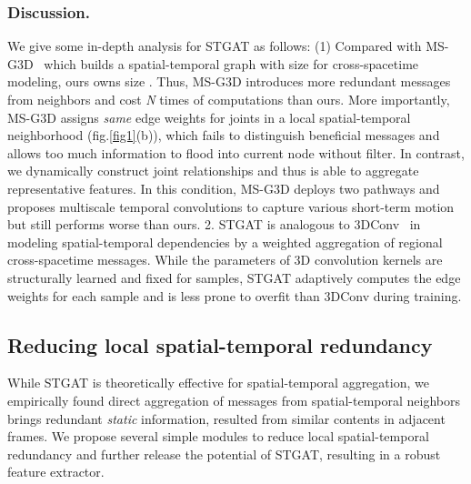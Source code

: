 \documentclass[runningheads]{llncs}
\begin{document}
\subsubsection{Discussion.}
We give some in-depth analysis for STGAT as follows: (1) Compared with MS-G3D~\cite{liu2020disentangling} which builds a spatial-temporal graph with size  for cross-spacetime modeling, ours owns size . Thus, MS-G3D introduces more redundant messages from neighbors and cost \textit{N} times of computations than ours. More importantly, MS-G3D assigns \textit{same} edge weights for joints in a local spatial-temporal neighborhood (fig.\ref{fig1}(b)), which fails to distinguish beneficial messages and allows too much information to flood into current node without filter. In contrast, we dynamically construct joint relationships and thus is able to aggregate representative features. In this condition, MS-G3D deploys two pathways and proposes multiscale temporal convolutions to capture various short-term motion but still performs worse than ours. 2. STGAT is analogous to 3DConv~\cite{tran2015learning,carreira2017quo} in modeling spatial-temporal dependencies by a weighted aggregation of regional cross-spacetime messages. While the parameters of 3D convolution kernels are structurally learned and fixed for samples, STGAT adaptively computes the edge weights for each sample and is less prone to overfit than 3DConv during training. 
  
\subsection{Reducing local spatial-temporal redundancy}
While STGAT is theoretically effective for spatial-temporal aggregation, we empirically found direct aggregation of messages from spatial-temporal neighbors brings redundant \textit{static} information, resulted from similar contents in adjacent frames. 
We propose several simple modules to reduce local spatial-temporal redundancy and further release the potential of STGAT, resulting in a robust feature extractor.
\end{document}
